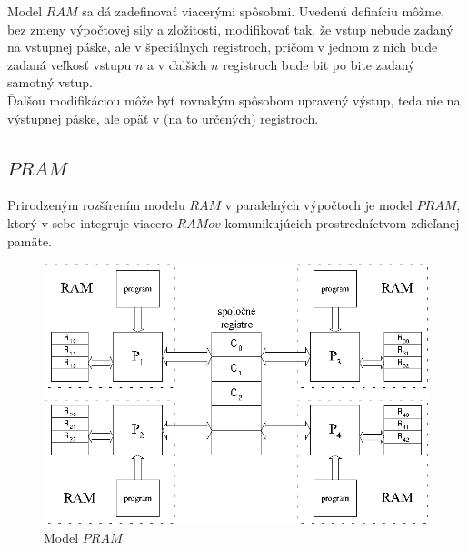 Model $RAM$ sa dá zadefinovať viacerými spôsobmi. Uvedenú
definíciu môžme, bez zmeny výpočtovej sily a zložitosti,
modifikovať tak, že vstup nebude zadaný na vstupnej páske, ale v
špeciálnych registroch, pričom v jednom z nich bude zadaná veľkosť
vstupu $n$ a v ďalšich $n$ registroch bude bit po bite zadaný
samotný vstup. \\ Ďalšou modifikáciou môže byť rovnakým spôsobom
upravený výstup, teda nie na výstupnej páske, ale opäť v (na to
určených) registroch.

\subsection{$PRAM$}

Prirodzeným rozšírením modelu $RAM$ v paralelných výpočtoch je
model $PRAM$, ktorý v sebe integruje viacero $RAMov$
komunikujúcich prostredníctvom zdieľanej pamäte.

\begin{figure}[!ht]
 \centering
 \includegraphics{img/pram/modepram.eps}
 \caption{Model $PRAM$} \label{pram_obr_modelpram}
\end{figure}

